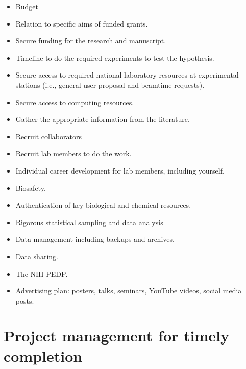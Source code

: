 \documentclass[10pt,letterpaper]{article}
\begin{document}
\begin{itemize}
  \item Budget
  \item Relation to specific aims of funded grants.
  \item Secure funding for the research and manuscript.
  \item Timeline to do the required experiments to test the hypothesis. 
  \item Secure access to required national laboratory resources at experimental stations (i.e., general user proposal and beamtime requests).
  \item Secure access to computing resources.
  \item Gather the appropriate information from the literature.
  \item Recruit collaborators
  \item Recruit lab members to do the work.
  \item Individual career development for lab members, including yourself.
  \item Biosafety.
  \item Authentication of key biological and chemical resources.
  \item Rigorous statistical sampling and data analysis
  \item Data management including backups and archives.
  \item Data sharing.
  \item The NIH PEDP.
  \item Advertising plan: posters, talks, seminars, YouTube videos, social media posts.
\end{itemize}


\section{Project management for timely completion}

\end{document}

